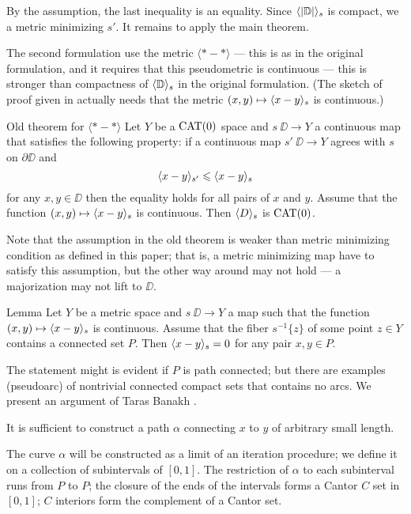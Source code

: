 By the assumption, the last inequality is an equality.
Since $\langle|\mathbb{D}|\rangle_s$ is compact, we a metric minimizing $s'$. %
It remains to apply the main theorem.
\qeds

The second formulation use the metric $\langle{*}-{*}\rangle$ --- this is as in the original formulation,
and it requires that this pseudometric is continuous --- this is stronger than  
compactness of $\langle\mathbb{D}\rangle_s$ in the original formulation.
(The sketch of proof given in \cite{petrunin-metric-min} actually needs that the metric $(x,y)\zz\mapsto\<x-y\>_{s}$ is continuous.)

\begin{thm}{Old theorem for $\bm{\langle{*}-{*}\rangle}$}
Let $Y$ be a $\mathop{\rm CAT}\nolimits(0)$ space and $s\:\DD\to Y$ a continuous map that satisfies the following property: 
if a continuous map $s'\:\DD\to Y$ agrees with $s$ on $\partial\DD$ and
\[\langle x-y\rangle_{s'}\leqslant \langle x-y\rangle_{s}\]
for any $x,y\in \DD$
then the equality holds for all pairs of $x$ and $y$.
Assume that the function $(x,y)\mapsto\langle x-y\rangle_{s}$ is continuous.
Then $\langle D\rangle_s$ is $\mathop{\rm CAT}\nolimits(0)$.
\end{thm}

Note that the assumption in the old theorem is weaker than metric minimizing condition as defined in this paper;
that is, a metric minimizing map have to satisfy this assumption, but the other way around may not hold --- a majorization may not lift to $\DD$.

\begin{thm}{Lemma}
Let $Y$ be a metric space and $s\:\DD\to Y$ a map such that the function $(x,y)\mapsto\langle x-y\rangle_{s}$ is continuous.
Assume that the fiber $s^{-1}\{z\}$ of some point $z\in Y$ contains a connected set $P$.
Then $\langle x-y\rangle_{s}=0$ for any pair $x,y\in P$.
\end{thm}


The statement might is evident if $P$ is path connected; 
but there are examples (pseudoarc) of nontrivial connected compact sets that contains no arcs.
We present an argument of Taras Banakh \cite{banakh}.

It is sufficient to construct a path $\alpha$ connecting $x$ to $y$ of arbitrary small length.

The curve $\alpha$ will be constructed as a limit of an iteration procedure;
we define it on a collection of subintervals of $[0,1]$.
The restriction of $\alpha$ to each subinterval runs from $P$ to $P$;
the closure of the ends of the intervals forms a Cantor $C$ set in $[0,1]$; 
 $C$ interiors form the complement of a Cantor set.

